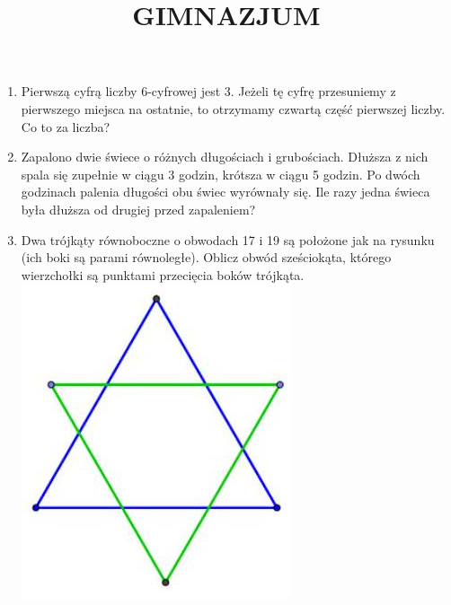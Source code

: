 \documentclass[10pt]{article}
\title{GIMNAZJUM }
\author{}
\date{}
\begin{document}
\maketitle
\begin{enumerate}
  \item Pierwszą cyfrą liczby 6-cyfrowej jest 3. Jeżeli tę cyfrę przesuniemy z pierwszego miejsca na ostatnie, to otrzymamy czwartą część pierwszej liczby. Co to za liczba?
  \item Zapalono dwie świece o różnych długościach i grubościach. Dłuższa z nich spala się zupełnie w ciągu 3 godzin, krótsza w ciągu 5 godzin. Po dwóch godzinach palenia długości obu świec wyrównały się. Ile razy jedna świeca była dłuższa od drugiej przed zapaleniem?
  \item Dwa trójkąty równoboczne o obwodach 17 i 19 są położone jak na rysunku (ich boki są parami równoległe). Oblicz obwód sześciokąta, którego wierzchołki są punktami przecięcia boków trójkąta.\\
\includegraphics[max width=\textwidth, center]{2024_11_21_2c6bbdad4db040b88220g-1}
\end{enumerate}
\end{document}
